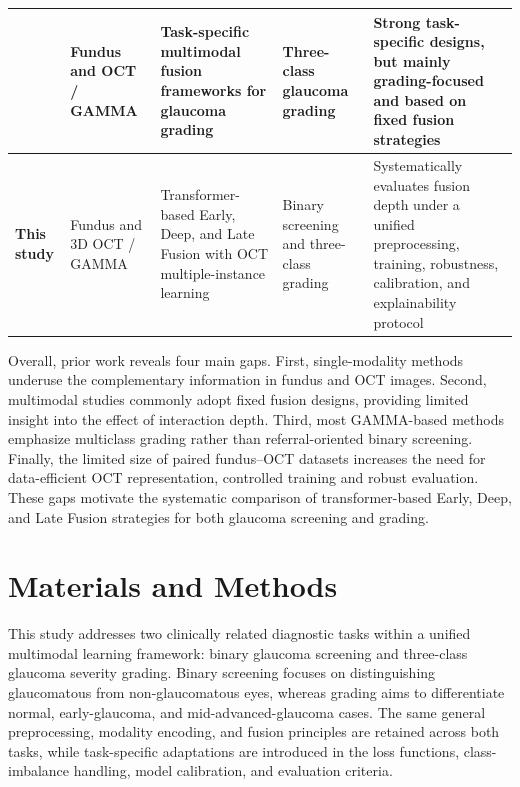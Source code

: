 \documentclass[sn-mathphys]{sn-jnl}%
\theoremstyle{thmstyleone}%
\theoremstyle{thmstyletwo}%
\theoremstyle{thmstylethree}%
\begin{document}
\begin{table}[!t]
{\begin{tabular}{|p{}|p{}|p{}|p{}|p{}|}
            \cite{cai2022corolla,zhao2025enhancing}                                                     &
            Fundus and OCT / GAMMA                                                                      &
            Task-specific multimodal fusion frameworks for glaucoma grading                             &
            Three-class glaucoma grading                                                                &
            Strong task-specific designs, but mainly grading-focused and based on fixed fusion strategies                                       \\
            \hline

            \textbf{This study}                                                                         &
            Fundus and 3D OCT / GAMMA                                                                   &
            Transformer-based Early, Deep, and Late Fusion with OCT multiple-instance learning          &
            Binary screening and three-class grading                                                    &
            Systematically evaluates fusion depth under a unified preprocessing, training, robustness, calibration, and explainability protocol \\
            \hline
        \end{tabular}}
\end{table}

Overall, prior work reveals four main gaps. First, single-modality methods underuse the complementary information in fundus and OCT images. Second, multimodal studies commonly adopt fixed fusion designs, providing limited insight into the effect of interaction depth. Third, most GAMMA-based methods emphasize multiclass grading rather than referral-oriented binary screening. Finally, the limited size of paired fundus--OCT datasets increases the need for data-efficient OCT representation, controlled training and robust evaluation. These gaps motivate the systematic comparison of transformer-based Early, Deep, and Late Fusion strategies for both glaucoma screening and grading.


\section{Materials and Methods}
\label{sec:materials_methods}

This study addresses two clinically related diagnostic tasks within a unified multimodal learning framework: binary glaucoma screening and three-class glaucoma severity grading. Binary screening focuses on distinguishing glaucomatous from non-glaucomatous eyes, whereas grading aims to differentiate normal, early-glaucoma, and mid-advanced-glaucoma cases. The same general preprocessing, modality encoding, and fusion principles are retained across both tasks, while task-specific adaptations are introduced in the loss functions, class-imbalance handling, model calibration, and evaluation criteria.
\end{document}
